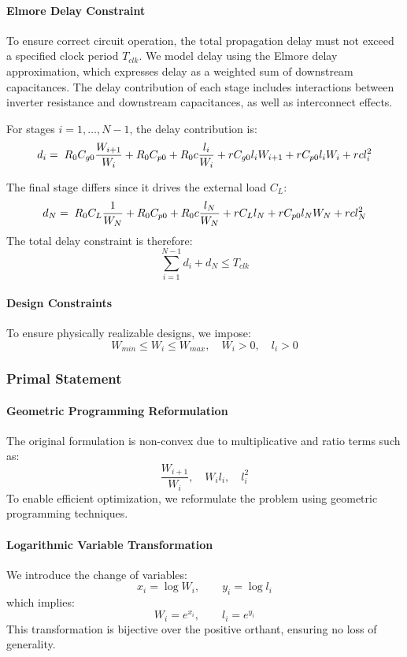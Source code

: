 \documentclass{article}
\begin{document}
\paragraph{Elmore Delay Constraint}

To ensure correct circuit operation, the total propagation delay must not exceed a specified clock period $T_{clk}$.
We model delay using the Elmore delay approximation, which expresses delay as a weighted sum of downstream capacitances.
The delay contribution of each stage includes interactions between inverter resistance and downstream capacitances,
as well as interconnect effects.

For stages $i = 1, \dots, N-1$, the delay contribution is:
\[ d_i = \; R_0 C_{g0}\frac{W_{i+1}}{W_i} + R_0 C_{p0} + R_0 c\frac{l_i}{W_i} \\
	+ r C_{g0} l_i W_{i+1} + r C_{p0} l_i W_i + r c l_i^2 \]

The final stage differs since it drives the external load $C_L$:
\[ d_N = \; R_0 C_L\frac{1}{W_N} + R_0 C_{p0} + R_0 c\frac{l_N}{W_N} \\
	+ r C_L l_N + r C_{p0} l_N W_N + r c l_N^2 \]
The total delay constraint is therefore: \[ \sum_{i=1}^{N-1} d_i + d_N \le T_{clk} \]

\paragraph{Design Constraints}
To ensure physically realizable designs, we impose:
\[ W_{min} \le W_i \le W_{max}, \quad W_i > 0, \quad l_i > 0 \]

\subsubsection{Primal Statement}
\paragraph{Geometric Programming Reformulation}
The original formulation is non-convex due to multiplicative and ratio terms such as:
\[ \frac{W_{i+1}}{W_i}, \quad W_i l_i, \quad l_i^2 \]
To enable efficient optimization, we reformulate the problem using geometric programming techniques.

\paragraph{Logarithmic Variable Transformation}
We introduce the change of variables:
\[ x_i = \log W_i, \qquad y_i = \log l_i \]
which implies:
\[ W_i = e^{x_i}, \qquad l_i = e^{y_i} \]
This transformation is bijective over the positive orthant, ensuring no loss of generality.
\end{document}
